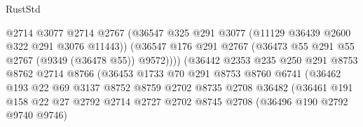 \begin{lexlean}{RustStd}
\begin{coremodule}
{\begin{coremodule}
{{{{{{{{{{{{{{{{{{{{{{{{{{{{{{{{{{{{{{{                                        @2714
                                        @3077
                                        @2714
                                        @2767
                                        (@36547
                                          @325
                                          @291
                                          @3077
                                          (@11129 @36439 @2600 @322 @291 @3076 @11443))
                                        (@36547
                                          @176
                                          @291
                                          @2767
                                          (@36473 @55 @291 @55 @2767 (@9349 (@36478 @55)) @9572))))
                                    (@36442
                                      @2353
                                      @235
                                      @250
                                      @291
                                      @8753
                                      @8762
                                      @2714
                                      @8766
                                      (@36453
                                        @1733
                                        @70
                                        @291
                                        @8753
                                        @8760
                                        @6741
                                        (@36462
                                          @193
                                          @22
                                          @69
                                          @3137
                                          @8752
                                          @8759
                                          @2702
                                          @8735
                                          @2708
                                          @36482
                                          (@36461
                                            @191
                                            @158
                                            @22
                                            @27
                                            @2792
                                            @2714
                                            @2727
                                            @2702
                                            @8745
                                            @2708
                                            (@36496 @190 @2792 @9740 @9746)
}}}}}}}}}}}}}}}}}}}}}}}}}}}}}}}}}}}}}}}
\end{coremodule}}
\end{coremodule}
\end{lexlean}
